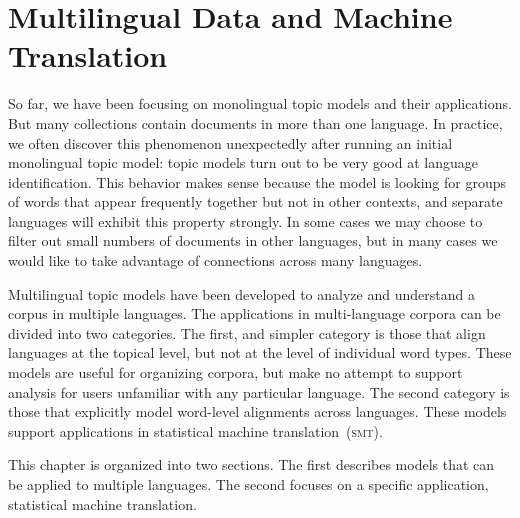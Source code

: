 \chapter{Multilingual Data and Machine Translation}
\label{ch:mt}

So far, we have been focusing on monolingual topic models and their applications.
But many collections contain documents in more than one language.
In practice, we often discover this phenomenon unexpectedly after running an initial monolingual topic model: topic models turn out to be very good at language identification.
This behavior makes sense because the model is looking for groups of words that appear frequently together but not in other contexts, and separate languages will exhibit this property strongly.
In some cases we may choose to filter out small numbers of documents in other languages, but in many cases we would like to take advantage of  connections across many languages.

Multilingual topic models have been developed to analyze and understand a corpus in multiple languages.
The applications in multi-language corpora can be divided into two categories.
The first, and simpler category is those that align languages at the topical level, but not at the level of individual word types.
These models are useful for organizing corpora, but make no attempt to support analysis for users unfamiliar with any particular language.
The second category is those that explicitly model word-level alignments across languages.
These models support applications in statistical machine translation~(\textsc{smt}).


This chapter is organized into two sections. The first describes models that can be applied to multiple languages. The second focuses on a specific application, statistical machine translation.

